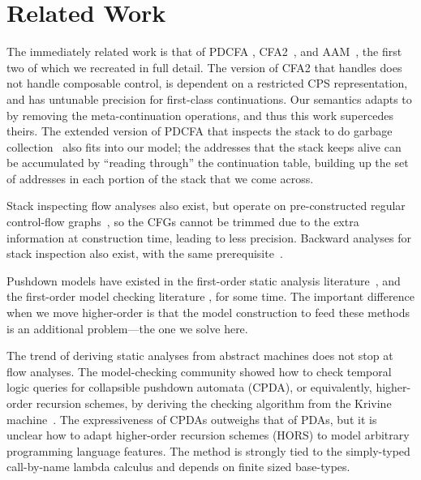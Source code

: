 \section{Related Work}

The immediately related work is that of PDCFA \citep{dvanhorn:Earl2010Pushdown, dvanhorn:Earl2012Introspective}, CFA2~\citep{ianjohnson:vardoulakis-lmcs11, ianjohnson:Vardoulakis2011Pushdown}, and AAM~\citep{dvanhorn:VanHorn2010Abstracting}, the first two of which we recreated in full detail.
%
The version of CFA2 that handles  does not handle composable control, is dependent on a restricted CPS representation, and has untunable precision for first-class continuations.
%
Our semantics adapts to  by removing the meta-continuation operations, and thus this work supercedes theirs.
%
The extended version of PDCFA that inspects the stack to do garbage collection~\citep{dvanhorn:Earl2012Introspective} also fits into our model;
the addresses that the stack keeps alive can be accumulated by ``reading through'' the continuation table, building up the set of addresses in each portion of the stack that we come across.

Stack inspecting flow analyses also exist, but operate on pre-constructed regular control-flow graphs~\citep{ianjohnson:bartoletti2004stack}, so the CFGs cannot be trimmed due to the extra information at construction time, leading to less precision.
%
Backward analyses for stack inspection also exist, with the same prerequisite~\citep{ianjohnson:DBLP:journals/sigplan/Chang06}.

Pushdown models have existed in the first-order static analysis literature~\citep[Chapter 7]{local:muchnick:jones:flow-analysis:1981}\citep{ianjohnson:reps:pushdown:1995}, and the first-order model checking literature \citep{ianjohnson:bouajiani:esparza:pushdown:1997}, for some time.
%
The important difference when we move higher-order is that the model construction to feed these methods is an additional problem---the one we solve here.

The trend of deriving static analyses from abstract machines does not stop at flow analyses.
%
The model-checking community showed how to check temporal logic queries for collapsible pushdown automata (CPDA), or equivalently, higher-order recursion schemes, by deriving the checking algorithm from the Krivine machine~\citep{ianjohnson:Salvati:2011:KMH:2027223.2027239}.
%
The expressiveness of CPDAs outweighs that of PDAs, but it is unclear how to adapt higher-order recursion schemes (HORS) to model arbitrary programming language features.
%
The method is strongly tied to the simply-typed call-by-name lambda calculus and depends on finite sized base-types.
%


